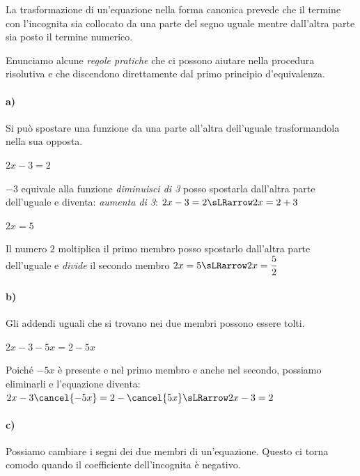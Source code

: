 \begin{osservazione}{}{}
La trasformazione di un'equazione nella forma canonica
prevede che il termine con l'incognita sia collocato da
una parte del segno uguale mentre dall'altra parte sia
posto il termine numerico.
\end{osservazione}

Enunciamo alcune \emph{regole pratiche} che ci possono aiutare nella
procedura risolutiva e che discendono direttamente dal primo principio
d'equivalenza.

\paragraph{a)} 
Si può spostare una funzione da una parte all'altra dell'uguale
trasformandola nella sua opposta.

\begin{esempio}{}{}
\(2x-3=2\)

\(-3\) equivale alla funzione \emph{diminuisci di 3} 
posso spostarla dall'altra parte dell'uguale e diventa:
\emph{aumenta di 3}:
\(2x-3=2 \sLRarrow 2x=2+3\)
\end{esempio}

\begin{esempio}{}{}
\(2x=5\)

Il numero \(2\) moltiplica il primo membro 
posso spostarlo dall'altra parte dell'uguale e
\emph{divide} il secondo membro
\(2x=5 \sLRarrow 2x=\dfrac{5}{2}\)
\end{esempio}

\paragraph{b)}
Gli addendi uguali che si trovano nei due membri possono essere tolti.

\begin{esempio}{}{}
\(2x-3-5x=2-5x\)

Poiché \(-5x\) è presente e nel primo membro e anche nel secondo, 
possiamo eliminarli e l'equazione diventa:
\(2x-3\cancel{-5x}=2-\cancel{5x} \sLRarrow 2x-3=2\)
\end{esempio}

\paragraph{c)} 
Possiamo cambiare i segni dei due membri di un'equazione. 
Questo ci torna comodo quando il coefficiente dell'incognita è negativo.

